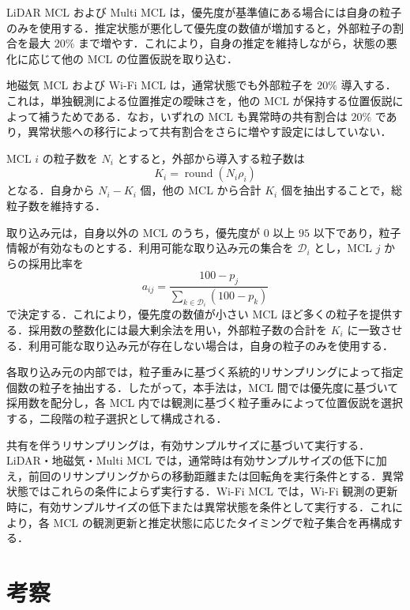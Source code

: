 LiDAR MCL および Multi MCL は，優先度が基準値にある場合には自身の粒子のみを使用する．推定状態が悪化して優先度の数値が増加すると，外部粒子の割合を最大 $20\%$ まで増やす．これにより，自身の推定を維持しながら，状態の悪化に応じて他の MCL の位置仮説を取り込む．

地磁気 MCL および Wi-Fi MCL は，通常状態でも外部粒子を $20\%$ 導入する．これは，単独観測による位置推定の曖昧さを，他の MCL が保持する位置仮説によって補うためである．なお，いずれの MCL も異常時の共有割合は $20\%$ であり，異常状態への移行によって共有割合をさらに増やす設定にはしていない．

MCL $i$ の粒子数を $N_i$ とすると，外部から導入する粒子数は
\begin{equation}
  K_i
  =
  \operatorname{round}(N_i\rho_i)
  \label{eq:external_particle_count}
\end{equation}
となる．自身から $N_i-K_i$ 個，他の MCL から合計 $K_i$ 個を抽出することで，総粒子数を維持する．

取り込み元は，自身以外の MCL のうち，優先度が $0$ 以上 $95$ 以下であり，粒子情報が有効なものとする．利用可能な取り込み元の集合を $\mathcal{D}_i$ とし，MCL $j$ からの採用比率を
\begin{equation}
  a_{ij}
  =
  \frac{100-p_j}
       {\displaystyle\sum_{k\in\mathcal{D}_i}(100-p_k)}
  \label{eq:donor_allocation_ratio}
\end{equation}
で決定する．これにより，優先度の数値が小さい MCL ほど多くの粒子を提供する．採用数の整数化には最大剰余法を用い，外部粒子数の合計を $K_i$ に一致させる．利用可能な取り込み元が存在しない場合は，自身の粒子のみを使用する．

各取り込み元の内部では，粒子重みに基づく系統的リサンプリングによって指定個数の粒子を抽出する．したがって，本手法は，MCL 間では優先度に基づいて採用数を配分し，各 MCL 内では観測に基づく粒子重みによって位置仮説を選択する，二段階の粒子選択として構成される．

共有を伴うリサンプリングは，有効サンプルサイズに基づいて実行する．LiDAR・地磁気・Multi MCL では，通常時は有効サンプルサイズの低下に加え，前回のリサンプリングからの移動距離または回転角を実行条件とする．異常状態ではこれらの条件によらず実行する．Wi-Fi MCL では，Wi-Fi 観測の更新時に，有効サンプルサイズの低下または異常状態を条件として実行する．これにより，各 MCL の観測更新と推定状態に応じたタイミングで粒子集合を再構成する．



\section{考察}
